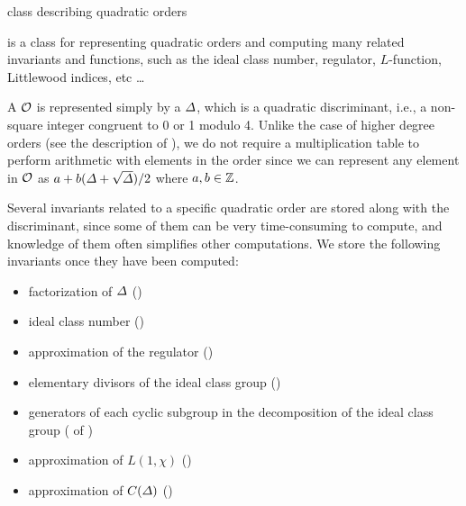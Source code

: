 

\NAME

 \dotfill class describing quadratic
orders



\ABSTRACT

 is a class for representing quadratic orders and computing many related
invariants and functions, such as the ideal class number, regulator, $L$-function, Littlewood
indices, etc \dots



\DESCRIPTION

A  $\mathcal{O}$ is represented simply by a  $\varDelta$, which is a
quadratic discriminant, i.e., a non-square integer congruent to 0 or 1 modulo 4.  Unlike the
case of higher degree orders (see the description of ), we do not require a
multiplication table to perform arithmetic with elements in the order since we can represent any
element in $\mathcal{O}$ as $a + b(\varDelta + \sqrt{\varDelta})/2$ where $a,b \in \mathbb{Z}$.

Several invariants related to a specific quadratic order are stored along with the discriminant,
since some of them can be very time-consuming to compute, and knowledge of them often simplifies
other computations.  We store the following invariants once they have been computed:
\begin{itemize}
\item factorization of $\varDelta$ ()
\item ideal class number ()
\item approximation of the regulator ()
\item elementary divisors of the ideal class group ()
\item generators of each cyclic subgroup in the decomposition of the ideal class group
  ( of )
\item approximation of $L(1,\chi )$ ()
\item approximation of $C(\varDelta )$ ()
\end{itemize}



